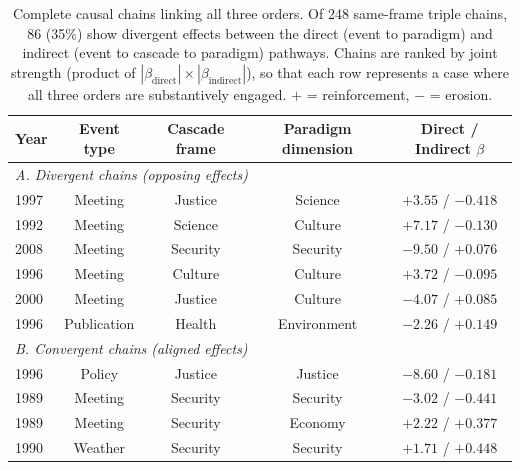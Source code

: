 \begin{table}[H]
\caption{Complete causal chains linking all three orders. 
Of 248 same-frame triple chains, 86 (35\%) show divergent effects 
between the direct (event to paradigm) and indirect (event to cascade to paradigm) pathways. 
Chains are ranked by joint strength (product of $|\beta_\mathrm{direct}| \times |\beta_\mathrm{indirect}|$), 
so that each row represents a case where all three orders are substantively engaged. 
$+$ = reinforcement, $-$ = erosion.}
\label{tab:triples}
\centering\footnotesize
\begin{tabular*}{\textwidth}{@{\extracolsep{\fill}}lcccc@{}}
\toprule
\textbf{Year} & \textbf{Event type} & \textbf{Cascade frame} & \textbf{Paradigm dimension} & \textbf{Direct / Indirect $\beta$} \\
\midrule
\multicolumn{5}{l}{\textit{A. Divergent chains (opposing effects)}} \\[3pt]
1997 & Meeting & Justice & Science & $+3.55$ / $-0.418$ \\
1992 & Meeting & Science & Culture & $+7.17$ / $-0.130$ \\
2008 & Meeting & Security & Security & $-9.50$ / $+0.076$ \\
1996 & Meeting & Culture & Culture & $+3.72$ / $-0.095$ \\
2000 & Meeting & Justice & Culture & $-4.07$ / $+0.085$ \\
1996 & Publication & Health & Environment & $-2.26$ / $+0.149$ \\
\midrule
\multicolumn{5}{l}{\textit{B. Convergent chains (aligned effects)}} \\[3pt]
1996 & Policy & Justice & Justice & $-8.60$ / $-0.181$ \\
1989 & Meeting & Security & Security & $-3.02$ / $-0.441$ \\
1989 & Meeting & Security & Economy & $+2.22$ / $+0.377$ \\
1990 & Weather & Security & Security & $+1.71$ / $+0.448$ \\
\bottomrule
\end{tabular*}
\end{table}